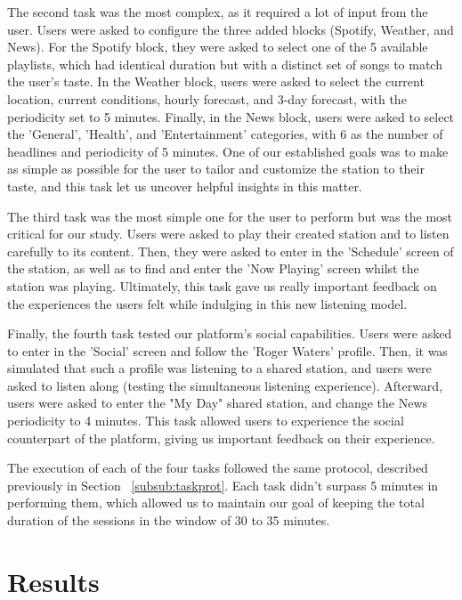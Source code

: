 The second task was the most complex, as it required a lot of input from the user. Users were asked to configure the three added blocks (Spotify, Weather, and News). For the Spotify block, they were asked to select one of the 5 available playlists, which had identical duration but with a distinct set of songs to match the user's taste. In the Weather block, users were asked to select the current location, current conditions, hourly forecast, and 3-day forecast, with the periodicity set to 5 minutes. Finally, in the News block, users were asked to select the 'General', 'Health', and 'Entertainment' categories, with 6 as the number of headlines and periodicity of 5 minutes. One of our established goals was to make as simple as possible for the user to tailor and customize the station to their taste, and this task let us uncover helpful insights in this matter.

The third task was the most simple one for the user to perform but was the most critical for our study. Users were asked to play their created station and to listen carefully to its content. Then, they were asked to enter in the 'Schedule' screen of the station, as well as to find and enter the 'Now Playing' screen whilst the station was playing. Ultimately, this task gave us really important feedback on the experiences the users felt while indulging in this new listening model.

Finally, the fourth task tested our platform's social capabilities. Users were asked to enter in the 'Social' screen and follow the 'Roger Waters' profile. Then, it was simulated that such a profile was listening to a shared station, and users were asked to listen along (testing the simultaneous listening experience). Afterward, users were asked to enter the "My Day" shared station, and change the News periodicity to 4 minutes. This task allowed users to experience the social counterpart of the platform, giving us important feedback on their experience.

The execution of each of the four tasks followed the same protocol, described previously in Section ~\ref{subsub:taskprot}. Each task didn't surpass 5 minutes in performing them, which allowed us to maintain our goal of keeping the total duration of the sessions in the window of 30 to 35 minutes.

\section{Results}

